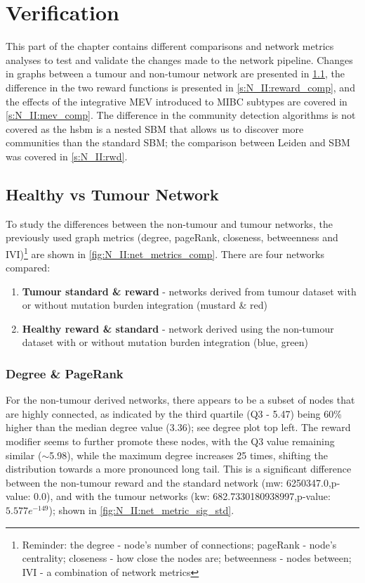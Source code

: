 \section{Verification} \label{s:N_II:validation}


This part of the chapter contains different comparisons and network metrics analyses to test and validate the changes made to the network pipeline. Changes in graphs between a tumour and non-tumour network are presented in \cref{s:N_II:net_comp}, the difference in the two reward functions is presented in \cref{s:N_II:reward_comp}, and the effects of the integrative MEV introduced to MIBC subtypes are covered in \cref{s:N_II:mev_comp}. The difference in the community detection algorithms is not covered as the \acrlong{hsbm} is a nested SBM that allows us to discover more communities than the standard SBM; the comparison between Leiden and SBM was covered in \cref{s:N_II:rwd}.


\subsection{Healthy vs Tumour Network} \label{s:N_II:net_comp}

To study the differences between the non-tumour and tumour networks, the previously used graph metrics (degree, pageRank, closeness, betweenness and IVI)\footnote{Reminder: the degree - node's number of connections; pageRank - node's centrality;  closeness - how close the nodes are; betweenness - nodes between; IVI - a combination of network metrics} are shown in \cref{fig:N_II:net_metrics_comp}. There are four networks compared:
\begin{enumerate}
    \item \textbf{Tumour standard \& reward} - networks derived from tumour dataset with or without mutation burden integration (mustard \& red)
    \item \textbf{Healthy reward \& standard} - network derived using the non-tumour dataset with or without mutation burden integration (blue, green)
\end{enumerate}


\subsubsection*{Degree \& PageRank}

For the non-tumour derived networks, there appears to be a subset of nodes that are highly connected, as indicated by the third quartile (Q3 - 5.47) being 60\% higher than the median degree value (3.36); see degree plot top left. The reward modifier seems to further promote these nodes, with the Q3 value remaining similar ($\sim$5.98), while the maximum degree increases 25 times, shifting the distribution towards a more pronounced long tail. This is a significant difference between the non-tumour reward and the standard network (\acrshort{mw}: 6250347.0,p-value: 0.0), and with the tumour networks (\acrshort{kw}: 682.7330180938997,p-value: $5.577e^{-149}$); shown in \cref{fig:N_II:net_metric_sig_std}.

